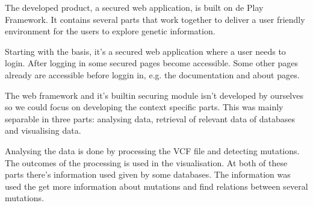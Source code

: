 The developed product, a secured web application, is built on de Play Framework. It contains several parts that work together to deliver a user friendly environment for the users to explore genetic information.

Starting with the basis, it's a secured web application where a user needs to login. After logging in some secured pages become accessible. Some other pages already are accessible before loggin in, e.g. the documentation and about pages.

The web framework and it's builtin securing module isn't developed by ourselves so we could focus on developing the context specific parts. This was mainly separable in three parts: analysing data, retrieval of relevant data of databases and visualising data.

Analysing the data is done by processing the VCF file and detecting mutations. The outcomes of the processing is used in the visualisation. At both of these parts there's information used given by some databases. The information was used the get more information about mutations and find relations between several mutations.